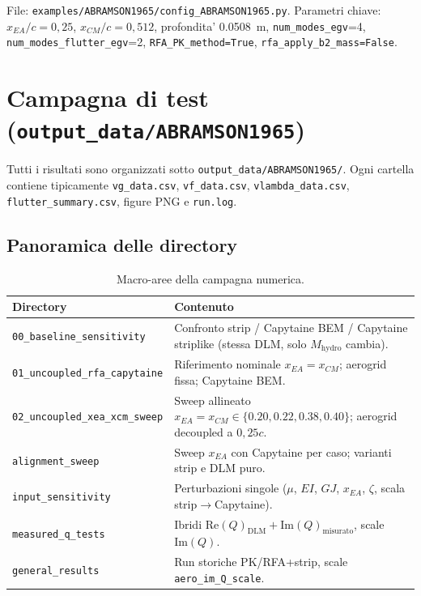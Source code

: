 \documentclass[11pt,a4paper]{article}
\begin{document}
File: \texttt{examples/ABRAMSON1965/config\_ABRAMSON1965.py}.
Parametri chiave: $x_{EA}/c=0{,}25$, $x_{CM}/c=0{,}512$, profondita' \SI{0.0508}{\meter},
\texttt{num\_modes\_egv}=4, \texttt{num\_modes\_flutter\_egv}=2,
\texttt{RFA\_PK\_method=True}, \texttt{rfa\_apply\_b2\_mass=False}.

\section{Campagna di test (\texttt{output\_data/ABRAMSON1965})}

Tutti i risultati sono organizzati sotto \texttt{output\_data/ABRAMSON1965/}.
Ogni cartella contiene tipicamente \texttt{vg\_data.csv}, \texttt{vf\_data.csv},
\texttt{vlambda\_data.csv}, \texttt{flutter\_summary.csv}, figure PNG e \texttt{run.log}.

\subsection{Panoramica delle directory}

\begin{table}[H]
  \centering
  \caption{Macro-aree della campagna numerica.}
  \small
  \begin{tabular}{p{3.6cm}p{9.8cm}}
    \toprule
    Directory & Contenuto \\
    \midrule
    \texttt{00\_baseline\_sensitivity} &
    Confronto strip / Capytaine BEM / Capytaine striplike (stessa DLM, solo $M_\mathrm{hydro}$ cambia). \\
    \texttt{01\_uncoupled\_rfa\_capytaine} &
    Riferimento nominale $x_{EA}=x_{CM}$; aerogrid fissa; Capytaine BEM. \\
    \texttt{02\_uncoupled\_xea\_xcm\_sweep} &
    Sweep allineato $x_{EA}=x_{CM}\in\{0.20,0.22,0.38,0.40\}$; aerogrid decoupled a $0{,}25c$. \\
    \texttt{alignment\_sweep} &
    Sweep $x_{EA}$ con Capytaine per caso; varianti strip e DLM puro. \\
    \texttt{input\_sensitivity} &
    Perturbazioni singole ($\mu$, $EI$, $GJ$, $x_{EA}$, $\zeta$, scala strip$\to$Capytaine). \\
    \texttt{measured\_q\_tests} &
    Ibridi $\mathrm{Re}(Q)_\mathrm{DLM}+\mathrm{Im}(Q)_\mathrm{misurato}$, scale $\mathrm{Im}(Q)$. \\
    \texttt{general\_results} & Run storiche PK/RFA+strip, scale \texttt{aero\_im\_Q\_scale}. \\
    \bottomrule
  \end{tabular}
\end{table}
\end{document}
